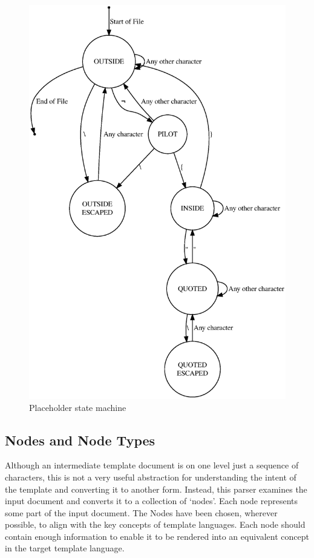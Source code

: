\begin{figure}[ht!]
\centering
\includegraphics[width=130mm]{Figures/statemachine.eps}
\caption{\label{state machine}Placeholder state machine}
\end{figure}

\subsection*{Nodes and Node Types}
\label{gilt:parser:nodes}

Although an intermediate template document is on one level just a sequence of characters, this is not a very useful abstraction for understanding the intent of the template and converting it to another form. Instead, this parser examines the input document and converts it to a collection of `nodes'. Each node represents some part of the input document. The Nodes have been chosen, wherever possible, to align with the key concepts of template languages. Each node should contain enough information to enable it to be rendered into an equivalent concept in the target template language.

